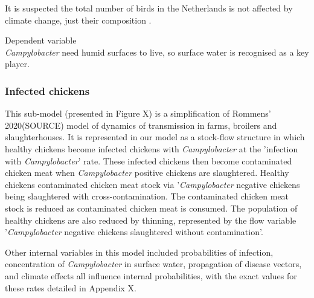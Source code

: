 It is suspected the total number of birds in the Netherlands is not affected by climate change, just their composition \parencite{mclean_reduced_2020, knudsen_challenging_2011}.



\textcolor{AMAZINGPINK}{Dependent variable} \\
\textit{Campylobacter} need humid surfaces to live, so surface water is recognised as a key player. %

\subsubsection*{Infected chickens}
This sub-model (presented in Figure X) is a simplification of Rommens' 2020(SOURCE) model of dynamics of transmission in farms, broilers and slaughterhouses. It is represented in our model as a stock-flow structure in which healthy chickens become infected chickens with \textit{Campylobacter} at the 'infection with \textit{Campylobacter}' rate. These infected chickens then become contaminated chicken meat when \textit{Campylobacter} positive chickens are slaughtered. Healthy chickens  contaminated chicken meat stock via '\textit{Campylobacter} negative chickens being slaughtered with cross-contamination. The contaminated chicken meat stock is reduced as contaminated chicken meat is consumed. The population of healthy chickens are also reduced by thinning, represented by the flow variable '\textit{Campylobacter} negative chickens slaughtered without contamination'.

Other internal variables in this model included probabilities of infection, concentration of \textit{Campylobacter} in surface water, propagation of disease vectors, and climate effects all influence internal probabilities, with the exact values for these rates detailed in Appendix X.



